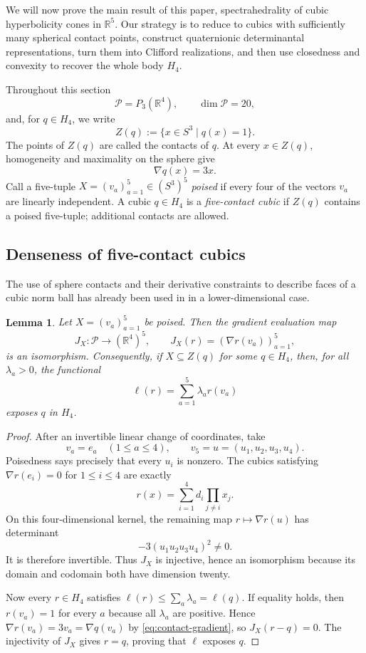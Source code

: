 \documentclass[11pt,onecolumn]{article}
\theoremstyle{blueplain}
\newtheorem{lemma}[lemma]{Lemma}
\theoremstyle{bluedefinition}
\theoremstyle{bluedefinition}
\newcommand{\R}{\mathbb R}
\begin{document}
We will now prove the main result of this paper, spectrahedrality of cubic hyperbolicity cones in $\R^5.$
Our strategy is to reduce to cubics with sufficiently many spherical contact points, construct quaternionic determinantal representations, turn them into Clifford realizations, and then use closedness and
convexity to recover the whole body $H_4$.

Throughout this section
\[
 \mathcal P=P_3(\mathbb R^4),\qquad \dim\mathcal P=20,
\]
and, for $q\in H_4$, we write
\[
 Z(q):=\{x\in S^3\mid q(x)=1\}.
\]
The points of $Z(q)$ are called the contacts of $q$.  At every
$x\in Z(q)$, homogeneity and maximality on the sphere give
\begin{equation}\label{eq:contact-gradient}
 \nabla q(x)=3x.
\end{equation}
Call a five-tuple $X=(v_a)_{a=1}^5\in(S^3)^5$ \emph{poised} if every
four of the vectors $v_a$ are linearly independent.  A cubic
$q\in H_4$ is a \emph{five-contact cubic} if $Z(q)$ contains a poised
five-tuple; additional contacts are allowed.

\subsection{Denseness of five-contact cubics}

The use of sphere contacts and their derivative constraints to describe
faces of a cubic norm ball has already been used in \cite{HildebrandIvanova} in a lower-dimensional case. 

\begin{lemma}\label{lem:poised}
Let $X=(v_a)_{a=1}^5$ be poised.  Then the gradient evaluation map
\[
 J_X\colon\mathcal P\to(\mathbb R^4)^5,
 \qquad J_X(r)=(\nabla r(v_a))_{a=1}^5,
\]
is an isomorphism.  Consequently, if $X\subseteq Z(q)$ for some $q\in H_4$,
then, for all $\lambda_a>0$, the functional
\[
 \ell(r)=\sum_{a=1}^5\lambda_a r(v_a)
\]
exposes $q$ in $H_4$.
\end{lemma}

\begin{proof}
After an invertible linear change of coordinates, take
\[
 v_a=e_a\quad(1\leqslant a\leqslant4),
 \qquad v_5=u=(u_1,u_2,u_3,u_4).
\]
Poisedness says precisely that every $u_i$ is nonzero.  The cubics satisfying
$\nabla r(e_i)=0$ for $1\leqslant i\leqslant4$ are exactly
\[
 r(x)=\sum_{i=1}^4d_i\prod_{j\ne i}x_j.
\]
On this four-dimensional kernel, the remaining map
$r\mapsto\nabla r(u)$ has determinant
\[
 -3(u_1u_2u_3u_4)^2\neq 0.
\]
It is therefore invertible.  Thus $J_X$ is injective, hence an isomorphism
because its domain and codomain both have dimension twenty.

Now every $r\in H_4$ satisfies
$\ell(r)\leqslant\sum_a\lambda_a=\ell(q)$.  If equality holds, then
$r(v_a)=1$ for every $a$ because all $\lambda_a$ are positive.  Hence
$\nabla r(v_a)=3v_a=\nabla q(v_a)$ by \eqref{eq:contact-gradient}, so
$J_X(r-q)=0$.  The injectivity of $J_X$ gives $r=q$, proving that $\ell$
exposes $q$.
\end{proof}
\end{document}
